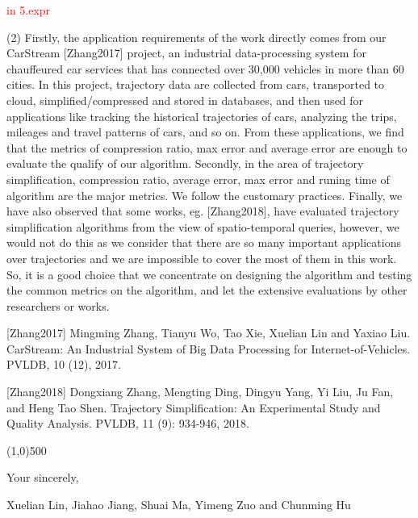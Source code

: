\documentclass{letter}
\begin{document}
\textcolor{red}{in 5.expr}

(2) Firstly, the application requirements of the work directly comes from our CarStream [Zhang2017] project, an industrial data-processing system for chauffeured car services that has connected over 30,000 vehicles in more than 60 cities. In this project, trajectory data are collected from cars, transported to cloud, simplified/compressed and stored in databases, and then used for applications like tracking the historical trajectories of cars, analyzing the trips, mileages and travel patterns of cars, and so on. From these applications, we find that the metrics of compression ratio, max error and average error are enough to evaluate the qualify of our algorithm. 
%
Secondly, in the area of trajectory simplification, compression ratio, average error, max error and runing time of algorithm are the major metrics. We follow the customary practices. 
%
Finally, we have also observed that some {works}, eg. [Zhang2018], have evaluated trajectory simplification algorithms from the view of spatio-temporal queries, however, we would not do this as we consider that there are so many important applications over trajectories and we are impossible to cover the most of them in this work. 
%
So, it is a good choice that we concentrate on designing the algorithm and testing the common metrics on the  algorithm, and let the extensive evaluations by other researchers or works.

[Zhang2017] Mingming Zhang, Tianyu Wo, Tao Xie, Xuelian Lin and Yaxiao Liu. CarStream: An Industrial System of Big Data Processing for Internet-of-Vehicles. PVLDB, 10 (12), 2017.

[Zhang2018] Dongxiang Zhang, Mengting Ding, Dingyu Yang, Yi Liu, Ju Fan, and Heng Tao Shen. Trajectory Simplification: An Experimental Study and Quality Analysis. PVLDB, 11 (9): 934-946, 2018.

\line(1,0){500}



Your sincerely,

Xuelian Lin, Jiahao Jiang, Shuai Ma, Yimeng Zuo and Chunming Hu



%
%
\end{document}
